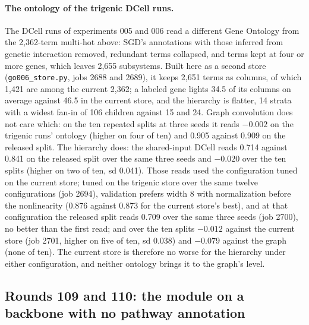 \paragraph{The ontology of the trigenic DCell runs.} The DCell runs of experiments 005
and 006 read a different Gene Ontology from the 2,362-term multi-hot above: SGD's
annotations with those inferred from genetic interaction removed, redundant terms
collapsed, and terms kept at four or more genes, which leaves 2,655 subsystems. Built
here as a second store (\texttt{go006\_store.py}, jobs 2688 and 2689), it keeps 2,651
terms as columns, of which 1,421 are among the current 2,362; a labeled gene lights
34.5 of its columns on average against 46.5 in the current store, and the hierarchy is
flatter, 14 strata with a widest fan-in of 106 children against 15 and 24. Graph
convolution does not care which: on the ten repeated splits at three seeds it reads
$-0.002$ on the trigenic runs' ontology (higher on four of ten) and 0.905 against 0.909
on the released split. The hierarchy does: the shared-input DCell reads 0.714 against
0.841 on the released split over the same three seeds and $-0.020$ over the ten splits
(higher on two of ten, sd 0.041). Those reads used the configuration tuned on the current store; tuned on the trigenic
store over the same twelve configurations (job 2694), validation prefers width 8 with
normalization before the nonlinearity (0.876 against 0.873 for the current store's best),
and at that configuration the released split reads 0.709 over the same three seeds (job
2700), no better than the first read; and over the ten splits $-0.012$ against the current store (job 2701, higher on five
of ten, sd 0.038) and $-0.079$ against the graph (none of ten). The current store is
therefore no worse for the hierarchy under either configuration, and neither ontology
brings it to the graph's level.





\subsection{Rounds 109 and 110: the module on a backbone with no pathway annotation}
\label{sec:round109}

